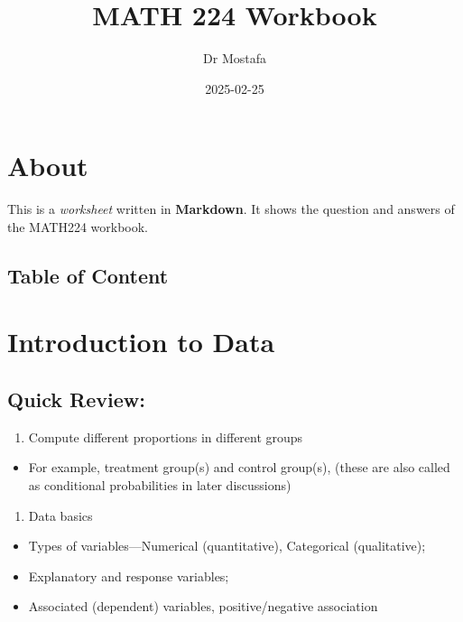 \documentclass[
]{book}
\title{MATH 224 Workbook}
\author{Dr Mostafa}
\date{2025-02-25}
\providecommand{\tightlist}{%
  \setlength{\itemsep}{0pt}\setlength{\parskip}{0pt}}
\begin{document}
\maketitle

{
\setcounter{tocdepth}{1}
\tableofcontents
}
\chapter{About}\label{about}

This is a \emph{worksheet} written in \textbf{Markdown}. It shows the question and answers of the MATH224 workbook.

\section{Table of Content}\label{table-of-content}

\chapter{Introduction to Data}\label{introduction-to-data}

\section{Quick Review:}\label{quick-review}

\begin{enumerate}
\def\labelenumi{\arabic{enumi}.}
\tightlist
\item
  Compute different proportions in different groups
\end{enumerate}

\begin{itemize}
\tightlist
\item
  For example, treatment group(s) and control group(s), (these are also called as conditional probabilities in later discussions)
\end{itemize}

\begin{enumerate}
\def\labelenumi{\arabic{enumi}.}
\setcounter{enumi}{1}
\tightlist
\item
  Data basics
\end{enumerate}

\begin{itemize}
\tightlist
\item
  Types of variables---Numerical (quantitative), Categorical (qualitative);
\item
  Explanatory and response variables;
\item
  Associated (dependent) variables, positive/negative association
\end{itemize}
\end{document}

